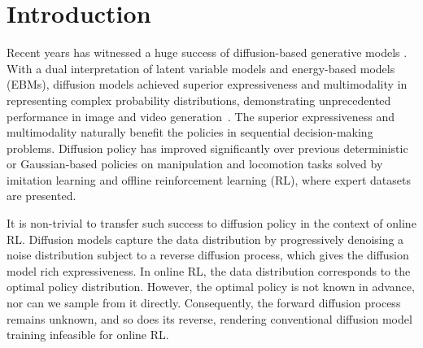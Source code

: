 \section{Introduction}
Recent years has witnessed a huge success of diffusion-based generative models \cite{sohl-dickstein2015deep,song2019generative,ho2020denoising}. With a dual interpretation of latent variable models and energy-based models (EBMs), diffusion models achieved superior expressiveness and multimodality in representing complex probability distributions, demonstrating unprecedented performance in image and video generation~\cite{ramesh2021zero,saharia2022photorealistic}. The superior expressiveness and multimodality naturally benefit the policies in sequential decision-making problems. Diffusion policy has improved significantly over previous deterministic or Gaussian-based policies on manipulation and locomotion tasks solved by imitation learning and offline reinforcement learning (RL),  where expert datasets are presented.




It is non-trivial to transfer such success to diffusion policy in the context of online RL. Diffusion models capture the data distribution by progressively denoising a noise distribution subject to a reverse diffusion process, which gives the diffusion model rich expressiveness. In online RL, the data distribution corresponds to the optimal policy distribution. However, the optimal policy is not known in advance, nor can we sample from it directly. Consequently, the forward diffusion process remains unknown, and so does its reverse, rendering conventional diffusion model training infeasible for online RL.

